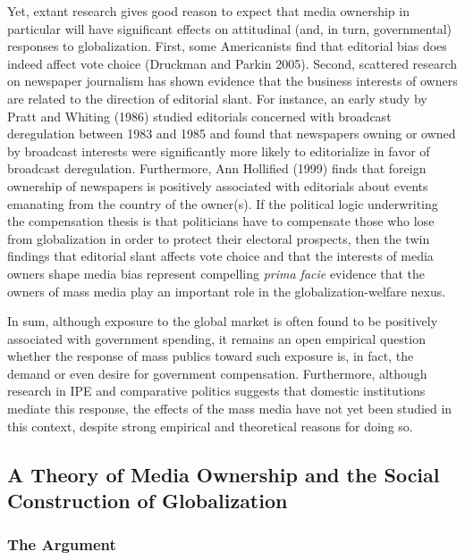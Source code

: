 \documentclass[12pt]{report}
\begin{document}
	Yet, extant research gives good reason to expect that media ownership in particular will have significant effects on attitudinal (and, in turn, governmental) responses to globalization. First, some Americanists find that editorial bias does indeed affect vote choice (Druckman and Parkin 2005). Second, scattered research on newspaper journalism has shown evidence that the business interests of owners are related to the direction of editorial slant. For instance, an early study by Pratt and Whiting (1986) studied editorials concerned with broadcast deregulation between 1983 and 1985 and found that newspapers owning or owned by broadcast interests were significantly more likely to editorialize in favor of broadcast deregulation. Furthermore, Ann Hollified (1999) finds that foreign ownership of newspapers is positively associated with editorials about events emanating from the country of the owner(s). If the political logic underwriting the compensation thesis is that politicians have to compensate those who lose from globalization in order to protect their electoral prospects, then the twin findings that editorial slant affects vote choice and that the interests of media owners shape media bias represent compelling \emph{prima facie} evidence that the owners of mass media play an important role in the globalization-welfare nexus.
	
	In sum, although exposure to the global market is often found to be positively associated with government spending, it remains an open empirical question whether the response of mass publics toward such exposure is, in fact, the demand or even desire for government compensation. Furthermore, although research in IPE and comparative politics suggests that domestic institutions mediate this response, the effects of the mass media have not yet been studied in this context, despite strong empirical and theoretical reasons for doing so.

\subsection{A Theory of Media Ownership and the Social Construction of Globalization}
\subsubsection{The Argument}
\end{document}
